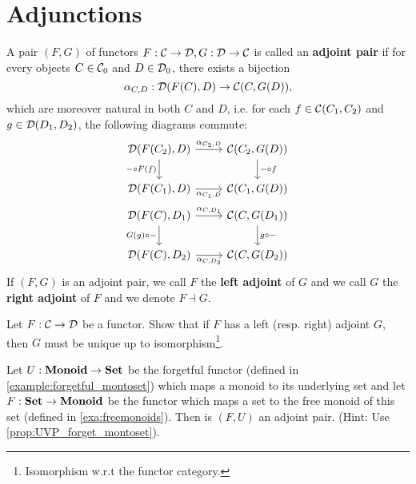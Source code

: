 \section{Adjunctions}
\label{sec:adjunctions}

\begin{dfn} A pair $(F,G)$ of functors $F : \mathcal{C}\to\mathcal{D}, G:\mathcal{D}\to\mathcal{C}$ is called an \textbf{adjoint pair} if for every objects $C\in{\mathcal{C}}_0$ and $D\in{\mathcal{D}}_0$, there exists a bijection 
\[
\alpha_{C,D} : {\mathcal{D}}(F(C),D) \to {\mathcal{C}}(C,G(D)),
\]
which are moreover natural in both $C$ and $D$, i.e. for each $f\in{\mathcal{C}}(C_1,C_2)$ and $g\in{\mathcal{D}}(D_1,D_2)$, the following diagrams commute:
\begin{eqnarray}
\begin{tikzcd}
\CHom{\DD}{F(C_2)}{D} \arrow[r, "\alpha_{C_2,D}"] \arrow[d,swap, "\co{F(f)}{-}"] & \CHom{\CC}{C_2}{G(D)} \arrow[d, "\co{f}{-}"] \\
\CHom{\DD}{F(C_1)}{D} \arrow[r,swap, "\alpha_{C_1,D}"] & \CHom{\CC}{C_1}{G(D)}
\end{tikzcd}\\
\begin{tikzcd}
\CHom{\DD}{F(C)}{D_1} \arrow[r, "\alpha_{C,D_1}"] \arrow[d,swap, "\co{-}{G(g)}"] & \CHom{\CC}{C}{G(D_1)} \arrow[d, "\co{-}{g}"] \\
\CHom{\DD}{F(C)}{D_2} \arrow[r,swap, "\alpha_{C,D_2}"] & \CHom{\CC}{C}{G(D_2)}
\end{tikzcd}
\end{eqnarray}
If $(F,G)$ is an adjoint pair, we call $F$ the \textbf{left adjoint} of $G$ and we call $G$ the \textbf{right adjoint} of $F$ and we denote $F \dashv G$.
\end{dfn}

\begin{exer} Let $F:\mathcal{C}\to\mathcal{D}$ be a functor. Show that if $F$ has a left (resp. right) adjoint $G$, then $G$ must be unique up to isomorphism\footnote{Isomorphism w.r.t the functor category.}.
\end{exer}

\begin{exer} Let $U:\mathbf{Monoid}\to \mathbf{Set}$ be the forgetful functor (defined in \cref{example:forgetful_montoset}) which maps a monoid to its underlying set and let $F : \mathbf{Set}\to\mathbf{Monoid}$ be the functor which maps a set to the free monoid of this set (defined in \cref{exa:freemonoids}). Then is $(F,U)$ an adjoint pair. (Hint: Use \cref{prop:UVP_forget_montoset}). 
\end{exer}

